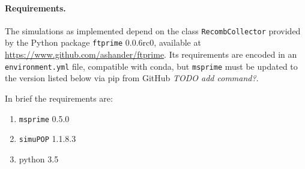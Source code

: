 \documentclass{article}
\newcommand{\simupop}{\texttt{simuPOP}}
\newcommand{\msprime}{\texttt{msprime}}
\newcommand{\ftprime}{\texttt{ftprime}}
\newcommand{\jda}[1]{{\em \color{cyan} #1}}
\begin{document}
\paragraph{Requirements.}
The simulations as implemented depend on the class \texttt{RecombCollector} provided by
the Python package \ftprime{} 0.0.6rc0,
available at \url{https://www.github.com/ashander/ftprime}.
Its requirements are encoded in an \texttt{environment.yml} file, compatible
with conda, but \msprime{} must be updated to the version listed below via pip
from GitHub \jda{TODO add command?}.

In brief the requirements are:

\begin{enumerate}
    \item \msprime{} 0.5.0
    \item \simupop{} 1.1.8.3
    \item python 3.5
\end{enumerate}
\end{document}
